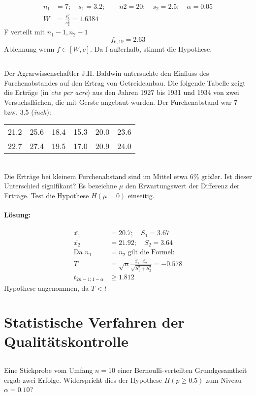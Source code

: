 \documentclass[ngerman]{scrartcl}
\begin{document}
\begin{align*}
n_1 &= 7;\quad s_1 = 3.2;\qquad n2 = 20;\quad s_2 = 2.5;\quad \alpha = 0.05\\
W &= \frac{s_1^2}{s_2^2} = 1.6384
\end{align*}
F verteilt mit $n_1-1, n_2-1$\[
f_{6,19} = 2.63
\]
Ablehnung wenn $f\in [W,c]$. Da f außerhalb, stimmt die Hypothese.
\subsection{}
Der Agrarwissenschaftler J.H. Baldwin untersuchte den Einfluss des Furchenabstandes auf den Ertrag von Getreideanbau. Die folgende Tabelle zeigt die Erträge (in \emph{ctw per acre}) aus den Jahren 1927 bis 1931 und 1934 von zwei Versuchsflächen, die mit Gerste angebaut wurden. Der Furchenabstand war 7 bzw. 3.5 (\emph{inch}):\\
\begin{tabular}{c c c c c c}
\hline
21.2& 25.6& 18.4& 15.3& 20.0& 23.6\\
22.7& 27.4& 19.5& 17.0& 20.9& 24.0\\\hline
\end{tabular}\\
Die Erträge bei kleinem Furchenabstand sind im Mittel etwa $6\%$ größer. Ist dieser Unterschied signifikant? Es bezeichne $\mu$ den Erwartungswert der Differenz der Erträge. Test die Hypothese $H(\mu = 0)$ einseitig.
\paragraph{Lösung:}
\begin{align*}
\overline{x_1} &= 20.7;\quad S_1 = 3.67\\
\overline{x_2} &= 21.92;\quad S_2 = 3.64\\
\text{Da } n_1&= n_2\text{ gilt die Formel:}\\
T &= \sqrt{n}\frac{\overline{x_1}\cdot \overline{x_2}}{\sqrt{S_1^{2} + S_2^{2}}} = -0.578\\
t_{2n-1;1-\alpha} &\ge 1.812
\end{align*}
Hypothese angenommen, da $T < t$
\section{Statistische Verfahren der Qualitätskontrolle}
\subsection{}
Eine Stickprobe vom Umfang $n=10$ einer Bernoulli-verteilten Grundgesamtheit ergab zwei Erfolge. Widerspricht dies der Hypothese $H(p\geq 0.5)$ zum Niveau $\alpha=0.10$?
\end{document}
